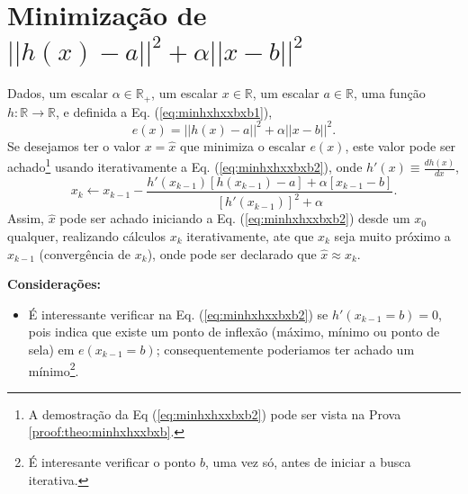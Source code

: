 \section{Minimização de $||h(x)-a||^2+\alpha ||x-b||^2$}


\begin{theorem}\label{theo:minhxhxxbxb}
Dados,
um escalar $\alpha \in \mathbb{R}_+$, 
um escalar $x \in \mathbb{R}$, 
um escalar $a \in \mathbb{R}$,  
uma função $h:\mathbb{R} \rightarrow \mathbb{R}$, e 
definida a Eq. (\ref{eq:minhxhxxbxb1}),
\begin{equation}\label{eq:minhxhxxbxb1}
e(x)=||h(x)-a||^2+\alpha ||x-b||^2.
\end{equation}
Se desejamos ter o valor $x=\hat{x}$ que minimiza o escalar $e(x)$,
este valor pode ser achado\footnote{A 
demostração da Eq (\ref{eq:minhxhxxbxb2}) pode ser vista na Prova \ref{proof:theo:minhxhxxbxb}.} 
 usando iterativamente a Eq. (\ref{eq:minhxhxxbxb2}),
onde  $h'(x)\equiv \frac{d h(x)}{d x}$,
\begin{equation}\label{eq:minhxhxxbxb2}
x_{k} \leftarrow x_{k-1}-
\frac{ h'(x_{k-1}) \left[h(x_{k-1})-a\right]+\alpha\left[ x_{k-1}-b\right]}{\left[h'(x_{k-1})\right]^2+\alpha}.
\end{equation}
Assim, $\hat{x}$ pode ser achado iniciando a Eq. (\ref{eq:minhxhxxbxb2}) desde um 
$x_{0}$ qualquer, realizando cálculos $x_{k}$ iterativamente, 
ate que $x_{k}$ seja muito próximo a $x_{k-1}$ (convergência de $x_{k}$),
onde pode ser declarado que $\hat{x} \approx x_{k}$.

\textbf{Considerações:}
\begin{itemize}
\item É interessante verificar na Eq. (\ref{eq:minhxhxxbxb2}) 
se  $h'(x_{k-1}=b) = 0$,
pois indica que existe um ponto de inflexão 
(máximo, mínimo ou ponto de sela) em $e(x_{k-1}=b)$;
consequentemente poderiamos ter achado um mínimo\footnote{É 
interesante verificar o ponto $b$, uma vez só, 
antes de iniciar a busca iterativa.}.
\end{itemize}

\end{theorem}

